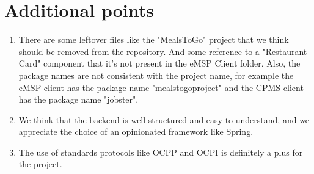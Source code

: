 \documentclass{article}
\begin{document}
\section{Additional points}
\begin{enumerate}
    \item There are some leftover files like the "MealsToGo" project that we think should be removed from the repository. And some reference to a "Restaurant Card" component that it's not present in the eMSP Client folder.
          Also, the package names are not consistent with the project name, for example the eMSP client has the package name "mealstogoproject" and the CPMS client has the package name "jobster".
    \item We think that the backend is well-structured and easy to understand, and we appreciate the choice of an opinionated framework like Spring.
    \item The use of standards protocols like OCPP and OCPI is definitely a plus for the project.
\end{enumerate}
\end{document}
